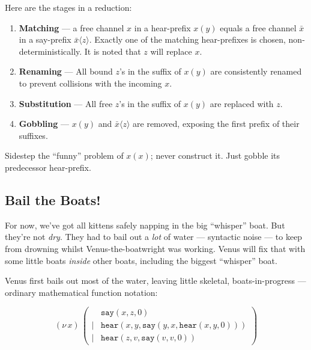 \documentclass[10pt,oneside,x11names]{article}
\newcommand\napping    [0]{0}
\newcommand\whispering [2]{(\nu\,#1)\,{#2}}
\theoremstyle{definition}
\theoremstyle{warning}
\begin{document}
Here are the stages in a reduction:

\begin{enumerate}
\item \textbf{Matching} --- a free channel \(x\) in a hear-prefix
\(x(y)\) equals a free channel \(\bar{x}\) in a say-prefix
\(\bar{x}\langle{z}\rangle\). Exactly one of the matching
hear-prefixes is chosen, non-deterministically. It is noted
that \(z\) will replace \(x\).

\item \textbf{Renaming} --- All bound \(z\)'s in the suffix of
\(x(y)\) are consistently renamed to prevent collisions with
the incoming \(x\).

\item \textbf{Substitution} --- All free \(z\)'s in the suffix of
\(x(y)\) are replaced with \(z\).

\item \textbf{Gobbling} --- \(x(y)\) and \(\bar{x}\langle{z}\rangle\)
are removed, exposing the first prefix of their suffixes.
\end{enumerate}

Sidestep the ``funny'' problem of \(x(x)\); never construct it.
Just gobble its predecessor hear-prefix.

\subsection{Bail the Boats!}
\label{sec:orgef66f62}

For now, we've got all kittens safely napping in the big
``whisper'' boat. But they're not \emph{dry}. They had to bail out a
\emph{lot} of water --- syntactic noise --- to keep from drowning
whilst Venus-the-boatwright was working. Venus will fix that
with some little boats \emph{inside} other boats, including the
biggest ``whisper'' boat.

Venus first bails out most of the water, leaving little skeletal,
boats-in-progress --- ordinary mathematical function notation:

\begin{equation}
\whispering{x}{\left(
\begin{array}{clll}
 {}     & \texttt{say} (x, z, \napping) \\
 \vert  & \texttt{hear}(x, y, \texttt{say}(y, x, \texttt{hear}(x, y, \napping))) \\
 \vert  & \texttt{hear}(z, v, \texttt{say}(v, v, \napping))
\end{array}\right)}
\end{equation}
\end{document}
